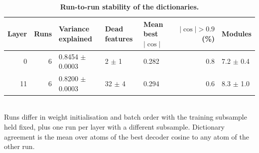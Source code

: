 \begin{table}[htbp]
\centering
\caption{\textbf{Run-to-run stability of the dictionaries.}}
\label{tab:seed_stability}
\smallskip
\small
\begin{tabular}{rrlllrl}
\toprule
Layer & Runs & Variance explained & Dead features & Mean best $|\cos|$ & $|\cos| > 0.9$ (\%) & Modules \\
\midrule
0 & 6 & 0.8454 $\pm$ 0.0003 & 2 $\pm$ 1 & 0.282 & 0.8 & 7.2 $\pm$ 0.4 \\
11 & 6 & 0.8200 $\pm$ 0.0003 & 32 $\pm$ 4 & 0.294 & 0.6 & 8.3 $\pm$ 1.0 \\
\bottomrule
\end{tabular}
\\[2pt]
\footnotesize Runs differ in weight initialisation and batch order with the training subsample held fixed, plus one run per layer with a different subsample. Dictionary agreement is the mean over atoms of the best decoder cosine to any atom of the other run.
\end{table}
